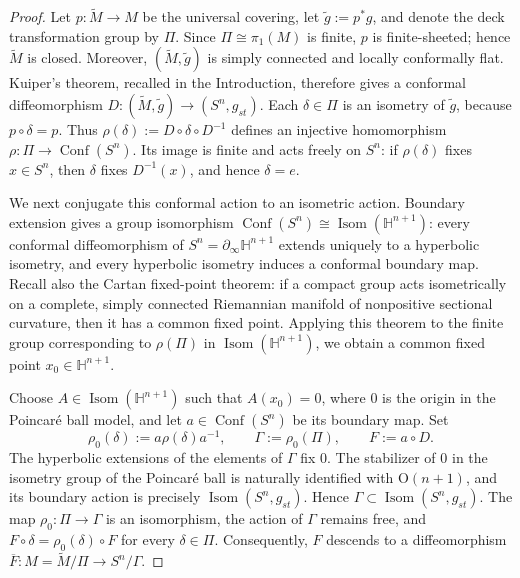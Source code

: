 \documentclass[12pt,oneside,a4paper]{article}
\theoremstyle{mytheorem}
\theoremstyle{remark}
\theoremstyle{definition}
\begin{document}
\begin{proof}
Let \(p\colon\widetilde M\to M\) be the universal covering, let
\(\widetilde g:=p^*g\), and denote the deck transformation group by \(\Pi\).
Since \(\Pi\cong\pi_1(M)\) is finite, \(p\) is finite-sheeted; hence
\(\widetilde M\) is closed. Moreover, \((\widetilde M,\widetilde g)\) is
simply connected and locally conformally flat. Kuiper's theorem, recalled in
the Introduction, therefore gives a conformal diffeomorphism
\(D\colon(\widetilde M,\widetilde g)\to (S^n,g_{st})\).
Each \(\delta\in\Pi\) is an isometry of \(\widetilde g\), because
\(p\circ\delta=p\). Thus \(\rho(\delta):=D\circ\delta\circ D^{-1}\)
defines an injective homomorphism
\(\rho\colon\Pi\to\operatorname{Conf}(S^n)\). Its image is finite and acts
freely on \(S^n\): if \(\rho(\delta)\) fixes \(x\in S^n\), then \(\delta\)
fixes \(D^{-1}(x)\), and hence \(\delta=e\).

We next conjugate this conformal action to an isometric action. Boundary
extension gives a group isomorphism
\(\operatorname{Conf}(S^n)\cong\operatorname{Isom}(\mathbb H^{n+1})\):
every conformal diffeomorphism of
\(S^n=\partial_\infty\mathbb H^{n+1}\) extends uniquely to a hyperbolic
isometry, and every hyperbolic isometry induces a conformal boundary map.
Recall also the Cartan fixed-point theorem: if a compact group acts
isometrically on a complete, simply connected Riemannian manifold of
nonpositive sectional curvature, then it has a common fixed point. Applying
this theorem to the finite group corresponding to \(\rho(\Pi)\) in
\(\operatorname{Isom}(\mathbb H^{n+1})\), we obtain a common fixed point
\(x_0\in\mathbb H^{n+1}\).

Choose \(A\in\operatorname{Isom}(\mathbb H^{n+1})\) such that \(A(x_0)=0\),
where \(0\) is the origin in the Poincar\'e ball model, and let
\(a\in\operatorname{Conf}(S^n)\) be its boundary map. Set
\[
\rho_0(\delta):=a\rho(\delta)a^{-1},
\qquad
\Gamma:=\rho_0(\Pi),
\qquad
F:=a\circ D.
\]
The hyperbolic extensions of the elements of \(\Gamma\) fix \(0\). The
stabilizer of \(0\) in the isometry group of the Poincar\'e ball is naturally
identified with \(\mathrm O(n+1)\), and its boundary action is precisely
\(\operatorname{Isom}(S^n,g_{st})\). Hence
\(\Gamma\subset\operatorname{Isom}(S^n,g_{st})\).
The map \(\rho_0\colon\Pi\to\Gamma\) is an isomorphism, the action of
\(\Gamma\) remains free, and \(F\circ\delta=\rho_0(\delta)\circ F\)
for every \(\delta\in\Pi\).
Consequently, \(F\) descends to a diffeomorphism
\(\overline F\colon M=\widetilde M/\Pi\to S^n/\Gamma\).


\end{proof}
\end{document}
